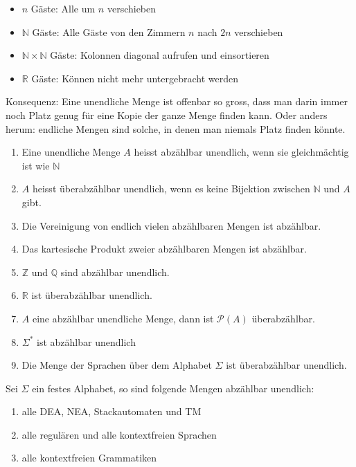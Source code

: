 \documentclass[a4paper]{article}
\begin{document}
	\begin{fmerke}
		\begin{itemize}
			\item $n$ Gäste: Alle um $n$ verschieben
			\item $\mathbb{N}$ Gäste: Alle Gäste von den Zimmern $n$ nach $2n$ verschieben
			\item $\mathbb{N} \times \mathbb{N}$ Gäste: Kolonnen diagonal aufrufen und einsortieren
			\item $\mathbb{R}$ Gäste: Können nicht mehr untergebracht werden
		\end{itemize}
		Konsequenz: Eine unendliche Menge ist offenbar so gross, dass man darin immer noch Platz genug für eine Kopie der ganze Menge finden kann. Oder anders herum: endliche Mengen sind solche, in denen man niemals Platz finden könnte.
	\end{fmerke}
	
	\begin{fdef}
	\begin{enumerate}
		\item Eine unendliche Menge $A$ heisst abzählbar unendlich, wenn sie gleichmächtig ist wie $\mathbb{N}$
		\item $A$ heisst überabzählbar unendlich, wenn es keine Bijektion zwischen $\mathbb{N}$ und $A$ gibt.
		\item Die Vereinigung von endlich vielen abzählbaren Mengen ist abzählbar.
		\item Das kartesische Produkt zweier abzählbaren Mengen ist abzählbar.
		\item $\mathbb{Z}$ und $\mathbb{Q}$ sind abzählbar unendlich.
		\item $\mathbb{R}$ ist überabzählbar unendlich.
		\item $A$ eine abzählbar unendliche Menge, dann ist $\mathcal{P}(A)$ überabzählbar.
		\item $\Sigma^*$ ist abzählbar unendlich
		\item Die Menge der Sprachen über dem Alphabet $\Sigma$ ist überabzählbar unendlich.
	\end{enumerate}
	\end{fdef}
	
	\begin{fmerke}[Anwendung]
	Sei $\Sigma$ ein festes Alphabet, so sind folgende Mengen abzählbar unendlich:
	\begin{enumerate}
		\item alle DEA, NEA, Stackautomaten und TM
		\item alle regulären und alle kontextfreien Sprachen
		\item alle kontextfreien Grammatiken
	\end{enumerate}
	\end{fmerke}
\end{document}
